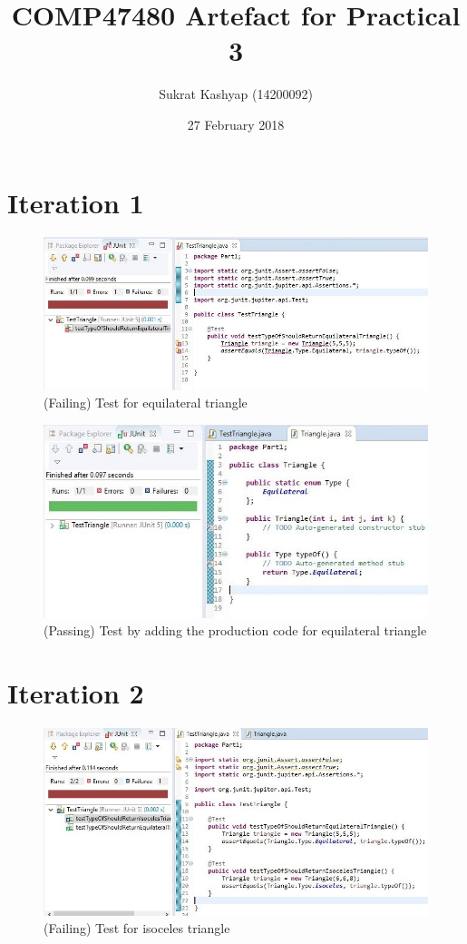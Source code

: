 \documentclass[9pt]{article}
\title{\vspace{-4.0cm}COMP47480 Artefact for Practical 3}
\author{Sukrat Kashyap (14200092)}
\date{27 February 2018}
\begin{document}
\maketitle

\section{Iteration 1}

\begin{figure}[htb]
    \includegraphics[width=\linewidth]{./pics/p1.JPG}
    \caption{(Failing) Test for equilateral triangle}
\end{figure}

\begin{figure}[htb]
    \includegraphics[width=\linewidth]{./pics/p2.JPG}
    \caption{(Passing) Test by adding the production code for equilateral triangle}
\end{figure}

\clearpage{}

\section{Iteration 2}

\begin{figure}[htb]
    \includegraphics[width=\linewidth]{./pics/p3.JPG}
    \caption{(Failing) Test for isoceles triangle}
\end{figure}
\end{document}
